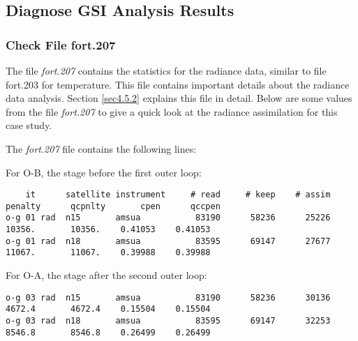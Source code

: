 \subsection{Diagnose GSI Analysis Results}

\subsubsection{Check File fort.207}

The file \textit{fort.207} contains the statistics for the radiance data, similar to file fort.203 for temperature.  This file contains important details about the radiance data analysis.  Section \ref{sec4.5.2} explains this file in detail.  Below are some values from the file \textit{fort.207} to give a quick look at the radiance assimilation for this case study.

The \textit{fort.207} file contains the following lines:

\hspace{4ex} For O-B, the stage before the first outer loop:

\begin{scriptsize}
\begin{verbatim}
    it      satellite instrument     # read     # keep    # assim  penalty      qcpnlty       cpen      qccpen
o-g 01 rad  n15       amsua           83190      58236      25226    10356.       10356.    0.41053    0.41053
o-g 01 rad  n18       amsua           83595      69147      27677    11067.       11067.    0.39988    0.39988
\end{verbatim}
\end{scriptsize}

\hspace{4ex} For O-A, the stage after the second outer loop:

\begin{scriptsize}
\begin{verbatim}
o-g 03 rad  n15       amsua           83190      58236      30136    4672.4       4672.4    0.15504    0.15504
o-g 03 rad  n18       amsua           83595      69147      32253    8546.8       8546.8    0.26499    0.26499
\end{verbatim}
\end{scriptsize}

